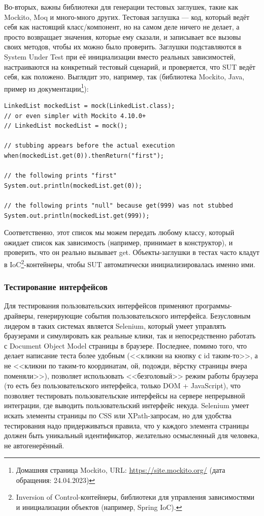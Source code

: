 \documentclass{../../text-style}
\begin{document}
Во-вторых, важны библиотеки для генерации тестовых заглушек, такие как Mockito, Moq и много-много других. Тестовая заглушка --- код, который ведёт себя как настоящий класс/компонент, но на самом деле ничего не делает, а просто возвращает значения, которые ему сказали, и записывает все вызовы своих методов, чтобы их можно было проверить. Заглушки подставляются в System Under Test при её инициализации вместо реальных зависимостей, настраиваются на конкретный тестовый сценарий, и проверяется, что SUT ведёт себя, как положено. Выглядит это, например, так (библиотека Mockito, Java, пример из документации\footnote{Домашняя страница Mockito, URL: \url{https://site.mockito.org/} (дата обращения: 24.04.2023)}):

\begin{verbatim}
LinkedList mockedList = mock(LinkedList.class);
// or even simpler with Mockito 4.10.0+
// LinkedList mockedList = mock();

// stubbing appears before the actual execution
when(mockedList.get(0)).thenReturn("first");

// the following prints "first"
System.out.println(mockedList.get(0));

// the following prints "null" because get(999) was not stubbed
System.out.println(mockedList.get(999));
\end{verbatim}

Соответственно, этот список мы можем передать любому классу, который ожидает список как зависимость (например, принимает в конструктор), и проверить, что он реально вызывает get. Объекты-заглушки в тестах часто кладут в IoC\footnote{Inversion of Control-контейнеры, библиотеки для управления зависимостями и инициализации объектов (например, Spring IoC).}-контейнеры, чтобы SUT автоматически инициализировалась именно ими.

\subsubsection{Тестирование интерфейсов}

Для тестирования пользовательских интерфейсов применяют программы-драйверы, генерирующие события пользовательского интерфейса. Безусловным лидером в таких системах является Selenium, который умеет управлять браузерами и симулировать как реальные клики, так и непосредственно работать с Document Object Model страницы в браузере. Последнее, помимо того, что делает написание теста более удобным (<<кликни на кнопку с id таким-то>>, а не <<кликни по таким-то координатам, ой, подожди, вёрстку страницы вчера поменяли>>), позволяет использовать <<безголовый>> режим работы браузера (то есть без пользовательского интерфейса, только DOM + JavaScript), что позволяет тестировать пользовательские интерфейсы на сервере непрерывной интеграции, где выводить пользовательский интерфейс некуда. Selenium умеет искать элементы страницы по CSS или XPath-запросам, но для удобства тестирования надо придерживаться правила, что у каждого элемента страницы должен быть уникальный идентификатор, желательно осмысленный для человека, не автогенерённый.
\end{document}
